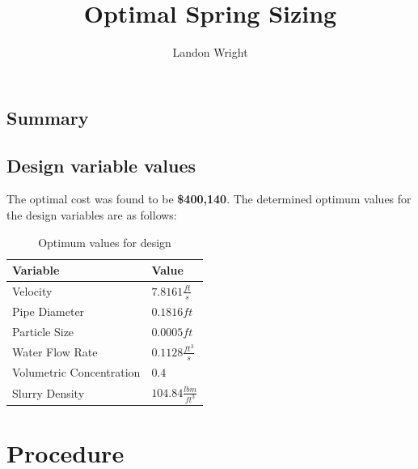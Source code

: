 \documentclass{article}
\begin{document}
\title{Optimal Spring Sizing}
\author{Landon Wright}
\maketitle
\begin{centering}
\section{Summary}

\end{centering}
\subsection{Design variable values}
The optimal cost was found to be \textbf{\$400,140}.
The determined optimum values for the design variables are as follows:

\begin{table}[H]
\centering
\caption{Optimum values for design}
\label{tab:optimum values}
\begin{tabular}{ll}
\hline
\textbf{Variable}      & \textbf{Value} \\
\hline
Velocity & $7.8161 \frac{ft}{s}$ \\
Pipe Diameter & $0.1816 ft$ \\
Particle Size  & $0.0005 ft$    \\
Water Flow Rate   & $0.1128 \frac{ft^{3}}{s}$\\
Volumetric Concentration & $0.4$\\
Slurry Density & $104.84 \frac{lbm}{ft^{3}}$\\

\hline

\end{tabular}
\end{table}
\newpage

\section{Procedure}
\end{document}
